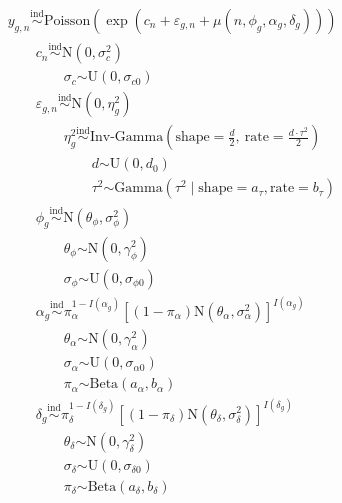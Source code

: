 \documentclass{article}\usepackage{graphicx, color}
\providecommand{\e}{\varepsilon}
\begin{document}
\begin{flushleft}
\begin{align*}
&y_{g,n} \stackrel{\text{ind}}{\sim} \text{Poisson}(\exp(c_n + \e_{g, n} + \mu(n, \phi_g, \alpha_g, \delta_g))) \\
&\qquad c_n \stackrel{\text{ind}}{\sim} \text{N}(0, \sigma_c^2) \\
& \qquad \qquad \sigma_c \stackrel{\text{}}{\sim} \text{U}(0, \sigma_{c0}) \\
& \qquad \e_{g, n} \stackrel{\text{ind}}{\sim} \text{N}(0, \eta_g^2) \\
& \qquad \qquad \eta_g^2 \stackrel{\text{ind}}{\sim} \text{Inv-Gamma}\left (\text{shape} = \frac{d}{2}, \ \text{rate} =  \frac{d \cdot \tau^2}{2} \right) \\
& \qquad \qquad \qquad d \stackrel{\text{}}{\sim} \text{U}(0, d_0) \\
& \qquad \qquad \qquad \tau^2 \stackrel{\text{}}{\sim} \text{Gamma}(\tau^2 \mid \text{shape} = a_\tau, \text{rate} = b_\tau) \\
& \qquad \phi_g \stackrel{\text{ind}}{\sim} \text{N}(\theta_\phi, \sigma_\phi^2) \\
& \qquad \qquad \theta_\phi \stackrel{\text{}}{\sim} \text{N}(0, \gamma_{\phi }^2) \\
& \qquad \qquad \sigma_\phi \stackrel{\text{}}{\sim} \text{U}(0, \sigma_{\phi 0}) \\
& \qquad \alpha_g \stackrel{\text{ind}}{\sim} \pi_\alpha^{1-I(\alpha_g)}[(1- \pi_\alpha)\text{N}(\theta_\alpha, \sigma_\alpha^2)]^{I(\alpha_g)} \\
& \qquad \qquad \theta_\alpha \stackrel{\text{}}{\sim} \text{N}(0, \gamma_{\alpha}^2) \\
& \qquad \qquad \sigma_\alpha \stackrel{\text{}}{\sim} \text{U}(0, \sigma_{\alpha 0}) \\
& \qquad \qquad \pi_\alpha \stackrel{\text{}}{\sim} \text{Beta}(a_{\alpha}, b_{\alpha}) \\
& \qquad \delta_g \stackrel{\text{ind}}{\sim} \pi_\delta^{1-I(\delta_g)}[(1- \pi_\delta)\text{N}(\theta_\delta, \sigma_\delta^2)]^{I(\delta_g)} \\& \qquad \qquad \theta_\delta \stackrel{\text{}}{\sim} \text{N}(0, \gamma_{\delta}^2) \\
& \qquad \qquad \sigma_\delta \stackrel{\text{}}{\sim} \text{U}(0, \sigma_{\delta 0}) \\
& \qquad \qquad \pi_\delta \stackrel{\text{}}{\sim} \text{Beta}(a_{\delta}, b_{\delta}) \\
\end{align*}


\end{flushleft}
\end{document}
